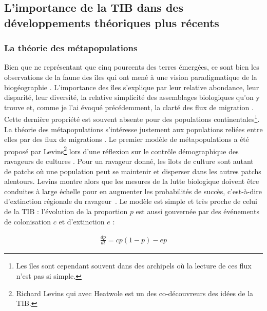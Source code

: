 \subsection*{L'importance de la TIB dans des développements théoriques
plus
récents}\label{limportance-de-la-tib-dans-des-duxe9veloppements-thuxe9oriques-plus-ruxe9cents}

\subsubsection*{La théorie des
métapopulations}\label{la-thuxe9orie-des-muxe9tapopulations}

Bien que ne représentant que cinq pourcents des terres émergées, ce sont
bien les observations de la faune des îles qui ont mené à une vision
paradigmatique de la biogéographie \citep{Simberloff1974a}. L'importance
des îles s'explique par leur relative abondance, leur disparité, leur
diversité, la relative simplicité des assemblages biologiques qu'on y
trouve et, comme je l'ai évoqué précédemment, la clarté des flux de
migration \citep{Simberloff1974a}. Cette dernière propriété est souvent
absente pour des populations continentales\footnote{Les îles sont
  cependant souvent dans des archipels où la lecture de ces flux n'est
  pas si simple.}. La théorie des métapopulations s'intéresse justement
aux populations reliées entre elles par des flux de migrations
\citep{Hanski2010}. Le premier modèle de métapopulations a été proposé
par Levins\footnote{Richard Levins qui avec Heatwole est un des
  co-découvreurs des idées de la TIB.} lors d'une réflexion sur le
contrôle démographique des ravageurs de cultures \citep{Levins1969}.
Pour un ravageur donné, les îlots de culture sont autant de patchs où
une population peut se maintenir et disperser dans les autres patchs
alentours. Levins montre alors que les mesures de la lutte biologique
doivent être conduites à large échelle pour en augmenter les
probabilités de succès, c'est-à-dire d'extinction régionale du
ravageur~\citep{Levins1969}. Le modèle est simple et très proche de
celui de la TIB : l'évolution de la proportion \(p\) est aussi gouvernée
par des événements de colonisation \(c\) et d'extinction \(e\) :

\begin{eqnarray}
\label{eqMW}
\frac{dp}{dt} = cp(1-p)-ep
\end{eqnarray}

